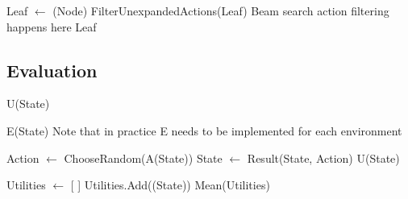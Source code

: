 \begin{algorithm}[H]
    \begin{algorithmic}[1]
        \State Leaf $\gets$ (Node)
        \State FilterUnexpandedActions(Leaf)
        \Comment Beam search action filtering happens here
        \State \Return Leaf
        \EndProcedure
    \end{algorithmic}    
\end{algorithm}

\newpage
\subsection*{Evaluation}

\begin{algorithm}[H]
    \begin{algorithmic}[1]
            \State \Return U(State)
        \EndProcedure
    \end{algorithmic}    
\end{algorithm}

\begin{algorithm}[H]
    \begin{algorithmic}[1]
            \State \Return E(State)
            \Comment Note that in practice E needs to be implemented for each environment
        \EndProcedure
    \end{algorithmic}    
\end{algorithm}

\begin{algorithm}[H]
    \begin{algorithmic}[1]
                \State Action $\gets$ ChooseRandom(A(State))
                \State State $\gets$ Result(State, Action)
            \EndWhile
            \State \Return U(State)
        \EndProcedure
    \end{algorithmic}    
\end{algorithm}

\begin{algorithm}[H]
    \begin{algorithmic}[1]
            \State Utilities $\gets$ [ ]
                \State Utilities.Add((State))
            \EndFor
            \State \Return Mean(Utilities)
        \EndProcedure
    \end{algorithmic}    
\end{algorithm}

